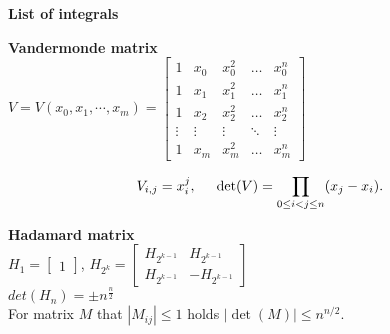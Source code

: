 \textbf{List of integrals}

\textbf{Vandermonde matrix}\\
$V = V(x_0, x_1, \cdots, x_m) =
\begin{bmatrix}
1 & x_0 & x_0^2 & \dots & x_0^n\\
1 & x_1 & x_1^2 & \dots & x_1^n\\
1 & x_2 & x_2^2 & \dots & x_2^n\\
\vdots & \vdots & \vdots & \ddots &\vdots \\
1 & x_m & x_m^2 & \dots & x_m^n
\end{bmatrix}$

$$V_{i,j} = x_i^j, \hspace{5mm} \det(V)=\prod_{0\le i<j\le n} (x_j-x_i).$$ 

\textbf{Hadamard matrix}\\
$H_{1} = \begin{bmatrix}
     1
 \end{bmatrix}$, \hspace{10mm}
$H_{2^k} = \begin{bmatrix}
     H_{2^{k-1}} &  H_{2^{k-1}}\\
     H_{2^{k-1}} & -H_{2^{k-1}}
  \end{bmatrix}$\\
  
$det(H_n) = \pm n^{\frac{n}{2}}$\\

For matrix $M$ that $|M_{ij}| \le 1$ holds $|\operatorname{det}(M)| \leq n^{n/2}$.

